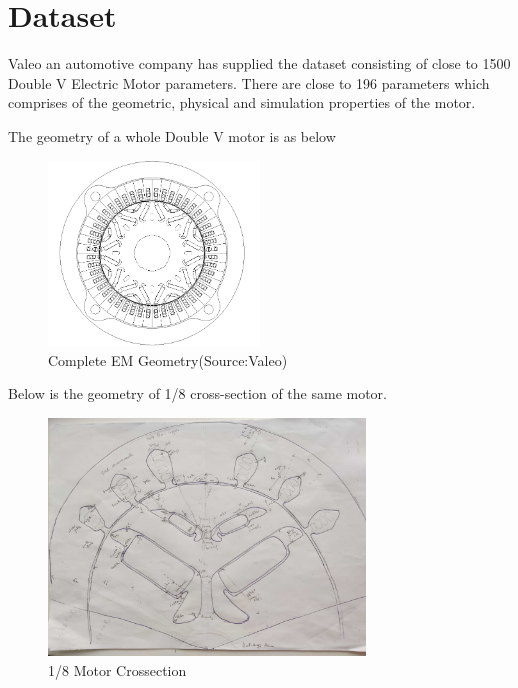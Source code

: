 \documentclass{report} %
\begin{document}
\newpage 

\chapter*{Dataset} 
Valeo an automotive company has supplied the dataset consisting of close to 1500 Double V Electric Motor parameters. 
There are close to 196 parameters which comprises of the geometric, physical and simulation properties of the motor.

The geometry of a whole Double V motor is as below

\begin{figure}[h]
    \centering
    \includegraphics[width=0.5\textwidth]{./ReportImages/FullMotorv2.png} 
    \caption{Complete EM Geometry(Source:Valeo)}
    \label{fig:Full Motor}
\end{figure}

Below is the geometry of 1/8 cross-section of the same motor.

\begin{figure}[h]
    \centering
    \includegraphics[width=0.75\textwidth]{./ReportImages/EMCrosssection.jpg} 
    \caption{1/8 Motor Crossection}
    \label{fig:1/8 Motor Crossection}
\end{figure}
\end{document}
